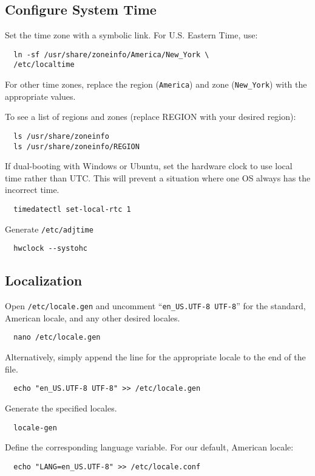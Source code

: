 \documentclass[letterpaper,12pt]{article}
\newcommand{\p}{\par\bigskip}
\begin{document}
\subsection{Configure System Time}
Set the time zone with a symbolic link. For U.S. Eastern Time, use:
\begin{lstlisting}
  ln -sf /usr/share/zoneinfo/America/New_York \
  /etc/localtime
\end{lstlisting} \p
For other time zones, replace the region ({\tt America}) and zone ({\tt New\_York}) with the appropriate values. \par

To see a list of regions and zones (replace REGION with your desired region):
\begin{lstlisting}
  ls /usr/share/zoneinfo
  ls /usr/share/zoneinfo/REGION
\end{lstlisting} \p

If dual-booting with Windows or Ubuntu, set the hardware clock to use local time rather than UTC. This will prevent a situation where one OS always has the incorrect time.
\begin{lstlisting}
  timedatectl set-local-rtc 1
\end{lstlisting} \p

Generate {\tt /etc/adjtime}
\begin{lstlisting}
  hwclock --systohc
\end{lstlisting}


\subsection{Localization}
Open {\tt /etc/locale.gen} and uncomment ``{\tt en\_US.UTF-8 UTF-8}'' for the standard, American locale, and any other desired locales.
\begin{lstlisting}
  nano /etc/locale.gen
\end{lstlisting} \p

Alternatively, simply append the line for the appropriate locale to the end of the file.
\begin{lstlisting}
  echo "en_US.UTF-8 UTF-8" >> /etc/locale.gen
\end{lstlisting} \p

Generate the specified locales.
\begin{lstlisting}
  locale-gen
\end{lstlisting} \p

Define the corresponding language variable. For our default, American locale:
\begin{lstlisting}
  echo "LANG=en_US.UTF-8" >> /etc/locale.conf
\end{lstlisting}
\end{document}
